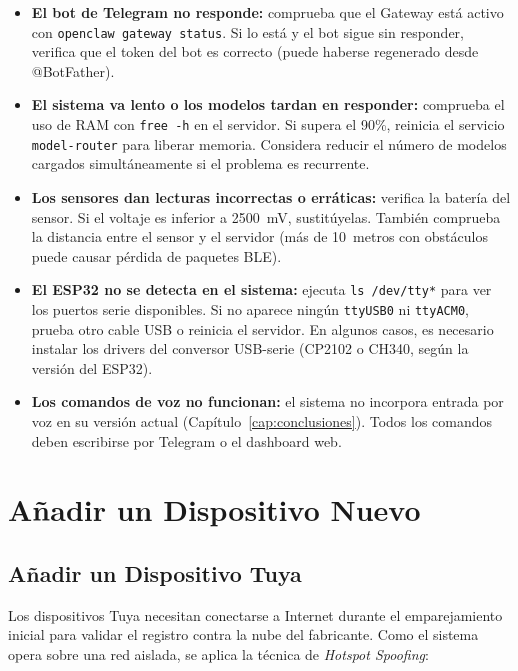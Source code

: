 \begin{itemize}
    \item \textbf{El bot de Telegram no responde:} comprueba que el Gateway está activo con \texttt{openclaw gateway status}. Si lo está y el bot sigue sin responder, verifica que el token del bot es correcto (puede haberse regenerado desde @BotFather).

    \item \textbf{El sistema va lento o los modelos tardan en responder:} comprueba el uso de RAM con \texttt{free -h} en el servidor. Si supera el 90\%, reinicia el servicio \texttt{model-router} para liberar memoria. Considera reducir el número de modelos cargados simultáneamente si el problema es recurrente.

    \item \textbf{Los sensores dan lecturas incorrectas o erráticas:} verifica la batería del sensor. Si el voltaje es inferior a 2500~mV, sustitúyelas. También comprueba la distancia entre el sensor y el servidor (más de 10~metros con obstáculos puede causar pérdida de paquetes BLE).

    \item \textbf{El ESP32 no se detecta en el sistema:} ejecuta \texttt{ls /dev/tty*} para ver los puertos serie disponibles. Si no aparece ningún \texttt{ttyUSB0} ni \texttt{ttyACM0}, prueba otro cable USB o reinicia el servidor. En algunos casos, es necesario instalar los drivers del conversor USB-serie (CP2102 o CH340, según la versión del ESP32).

    \item \textbf{Los comandos de voz no funcionan:} el sistema no incorpora entrada por voz en su versión actual (Capítulo~\ref{cap:conclusiones}). Todos los comandos deben escribirse por Telegram o el dashboard web.
\end{itemize}

\section{Añadir un Dispositivo Nuevo}

\subsection{Añadir un Dispositivo Tuya}

Los dispositivos Tuya necesitan conectarse a Internet durante el emparejamiento inicial para validar el registro contra la nube del fabricante. Como el sistema opera sobre una red aislada, se aplica la técnica de \textit{Hotspot Spoofing}:

